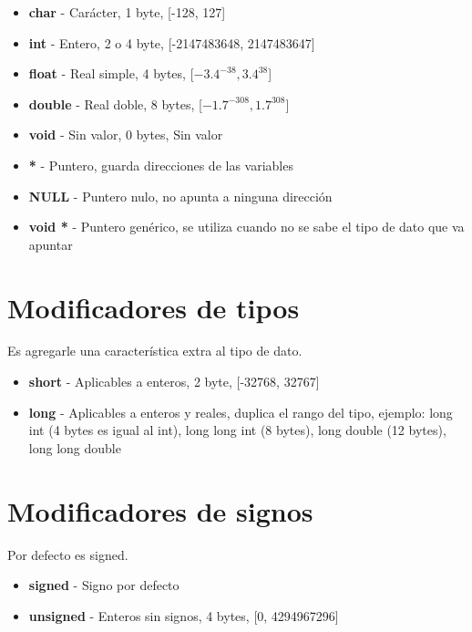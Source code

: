 	\vspace{1em}
	\begin{itemize}
		\item {\textbf{char}} - Carácter, 1 byte, [-128, 127]
		\item {\textbf{int}} - Entero, 2 o 4 byte, [-2147483648, 2147483647]
		\item {\textbf{float}} - Real simple, 4 bytes, [$-3.4^{-38}, 3.4^{38}$]
		\item {\textbf{double}} - Real doble, 8 bytes, [$-1.7^{-308}, 1.7^{308}$]
		\item {\textbf{void}} - Sin valor, 0 bytes, Sin valor
		\item {\textbf{*}} - Puntero, guarda direcciones de las variables
		\item {\textbf{NULL}} - Puntero nulo, no apunta a ninguna dirección
		\item {\textbf{void *}} - Puntero genérico, se utiliza cuando no se sabe el tipo de dato que va apuntar
	\end{itemize}


\section [Modificadores de tipos]{Modificadores de tipos}
Es agregarle una característica extra al tipo de dato.

\vspace{1em}
\begin{itemize}
	\item {\textbf{short}} - Aplicables a enteros, 2 byte, [-32768, 32767]
	\item {\textbf{long}} - Aplicables a enteros y reales, duplica el rango del tipo, ejemplo: long int (4 bytes es igual al int), long long int (8 bytes), long double (12 bytes), long long double
\end{itemize}

\section [Modificadores de signos]{Modificadores de signos}
Por defecto es {signed}.

\vspace{1em}
\begin{itemize}
	\item {\textbf{signed}} - Signo por defecto
	\item {\textbf{unsigned}} - Enteros sin signos, 4 bytes, [0, 4294967296]
\end{itemize}

